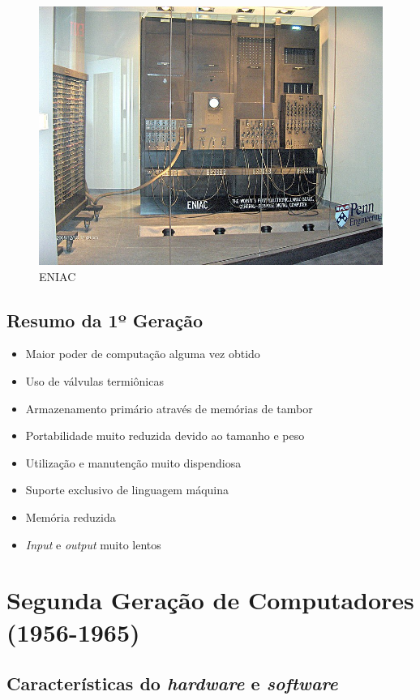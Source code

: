 \documentclass{report}
\begin{document}
\begin{figure}[H]
\centering
\includegraphics[width=0.7\linewidth]{ENIAC.jpg}
\caption{ENIAC}
\label{eniac}
\end{figure}

\section{Resumo da 1º Geração}

\begin{itemize}
\item Maior poder de computação alguma vez obtido
\item Uso de válvulas termiônicas 
\item Armazenamento primário através de memórias de tambor
\item Portabilidade muito reduzida devido ao tamanho e peso
\item Utilização e manutenção muito dispendiosa
\item Suporte exclusivo de linguagem máquina
\item Memória reduzida
\item \textit{Input} e \textit{output} muito lentos
\end{itemize}


\chapter{Segunda Geração de Computadores (1956-1965)}
\label{chap.SG}
\section{Características do \textit{hardware} e \textit{software} }
\end{document}
